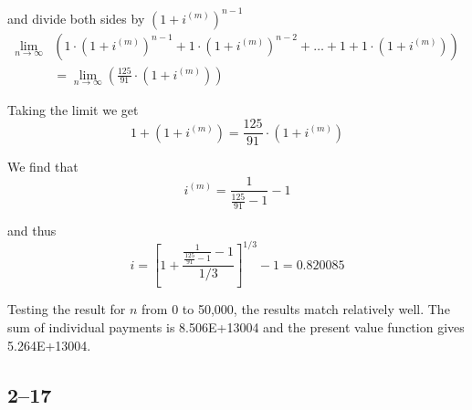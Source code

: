 \documentclass[a4paper, 12pt, reqno]{amsart}
\numberwithin{equation}{section}
\begin{document}
and divide both sides by $\left(1+i^{(m)}\right)^{n-1}$
\begin{equation}\nonumber
    \begin{aligned}
        \lim_{n\rightarrow\infty} &\left(1 \cdot
        \left(1+i^{(m)}\right)^{n-1} + 1 \cdot
        \left(1+i^{(m)}\right)^{n-2}
            + \dots  +  1
            + 1 \cdot \left(1+i^{(m)}\right) \right) \\
        &=\lim_{n\rightarrow\infty} \left(\frac{125}{91} \cdot \left(1+i^{(m)}
            \right) \right)
    \end{aligned}
\end{equation}

Taking the limit we get
\begin{equation}\nonumber
    1 + \left(1+i^{(m)}\right)
    =\frac{125}{91} \cdot \left(1+i^{(m)}\right)
\end{equation}

We find that 
\begin{equation}\nonumber
    i^{(m)} = \frac{1}{\frac{125}{91}-1} - 1
\end{equation}

and thus 
\begin{equation}\nonumber
    i = \left[ 1 + \frac{\frac{1}{\frac{125}{91}-1} - 1}{1/3} \right]^{1/3} - 1
        = 0.820085
\end{equation}

Testing the result for $n$ from 0 to 50,000, the results match relatively well.
The sum of individual payments is 8.506E+13004 and the present value function
gives 5.264E+13004.

\subsection*{2--17}

\begin{center}
\end{center}
\end{document}
